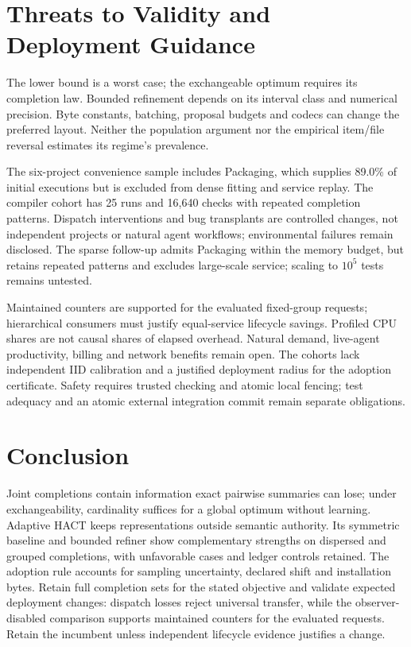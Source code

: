 \documentclass[10pt,journal,compsoc]{IEEEtran}
\theoremstyle{definition}\newtheorem{definition}[theorem]{Definition}
\begin{document}
\section{Threats to Validity and Deployment Guidance}
The lower bound is a worst case; the exchangeable optimum requires its
completion law. Bounded refinement depends on its interval class and numerical
precision. Byte constants, batching, proposal budgets and codecs can change
the preferred layout. Neither the population argument nor the empirical
item/file reversal estimates its regime's prevalence.

The six-project convenience sample includes Packaging, which supplies 89.0\%
of initial executions but is excluded from dense fitting and service replay.
The compiler cohort has 25 runs and 16,640 checks with repeated completion
patterns. Dispatch interventions and bug transplants are controlled changes,
not independent projects or natural agent workflows; environmental failures
remain disclosed. The sparse follow-up admits Packaging within the memory
budget, but retains repeated patterns and excludes large-scale service;
scaling to $10^5$ tests remains untested.

Maintained counters are supported for the evaluated fixed-group requests;
hierarchical consumers must justify equal-service lifecycle savings. Profiled
CPU shares are not causal shares of elapsed overhead. Natural demand,
live-agent productivity, billing and network benefits remain open. The cohorts
lack independent IID calibration and a justified deployment radius for the
adoption certificate. Safety requires trusted checking and atomic local
fencing; test adequacy and an atomic external integration commit remain
separate obligations.

\section{Conclusion}
Joint completions contain information exact pairwise summaries can lose;
under exchangeability, cardinality suffices for a global optimum without
learning. Adaptive HACT keeps representations outside semantic authority.
Its symmetric baseline and bounded refiner show complementary strengths on
dispersed and grouped completions, with unfavorable cases and ledger controls
retained. The adoption rule accounts for sampling uncertainty, declared
shift and installation bytes. Retain full completion sets for the stated
objective and validate expected deployment changes: dispatch losses reject
universal transfer, while the observer-disabled comparison supports maintained
counters for the evaluated requests. Retain the incumbent unless independent
lifecycle evidence justifies a change.
\end{document}
